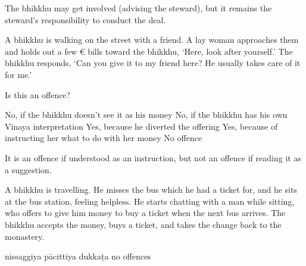 \begin{exam}{\autoExamName}
\begin{problem*}
\begin{parts}
      \begin{solution}
        The bhikkhu may get involved (advising the steward), but it remains the
        steward's responsibility to conduct the deal.
      \end{solution}

    \end{parts}

  \end{problem*}

  \problemDivide

  \begin{problem}

    A bhikkhu is walking on the street with a friend. A lay woman approaches
    them and holds out a few € bills toward the bhikkhu, `Here, look after
    yourself.' The bhikkhu responds, `Can you give it to my friend here? He
    usually takes care of it for me.'

    \bigskip

    Is this an offence?

    \bigskip

    \begin{answers}{1}
      \bChoices
       No, if the bhikkhu doesn't see it as his money\eAns
       No, if the bhikkhu has his own Vinaya interpretation\eAns
       Yes, because he diverted the offering\eAns
       Yes, because of instructing her what to do with her money\eAns
       No offence\eAns
      \eChoices
    \end{answers}

    \begin{solution}
      It is an offence if understood as an instruction, but not an offence if
      reading it as a suggestion.
    \end{solution}

  \end{problem}

  \problemDivide

  \begin{problem}
    A bhikkhu is travelling. He misses the bus which he had a ticket for, and he
    sits at the bus station, feeling helpless. He starts chatting with a man
    while sitting, who offers to give him money to buy a ticket when the next
    bus arrives. The bhikkhu accepts the money, buys a ticket, and takes the
    change back to the monastery.
  \end{problem}

  \bigskip

    \begin{answers}{3}
      \bChoices
       nissaggiya pācittiya\eAns
       dukkaṭa\eAns
       no offences\eAns
      \eChoices
    \end{answers}


\end{exam}
